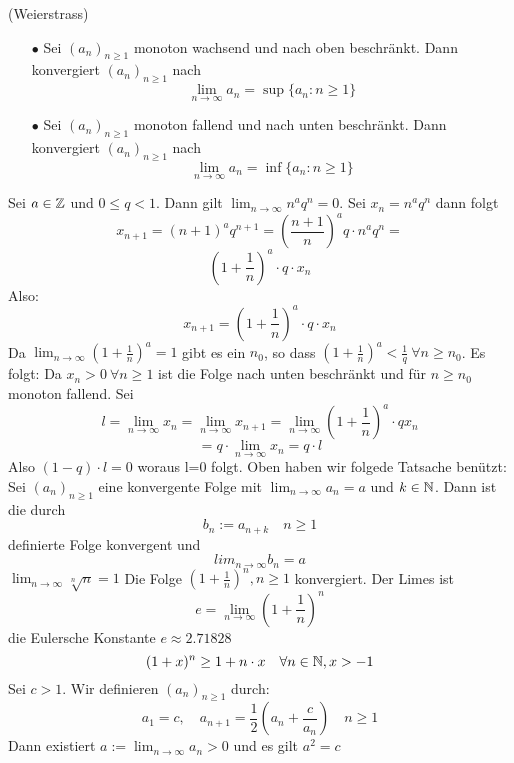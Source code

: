 \Satz[2.11] (Weierstrass)
\begin{enumerate}
    \item [\(\bullet\)] Sei \((a_n)_{n \geq 1}\) monoton wachsend und nach oben beschränkt. Dann konvergiert \((a_n)_{n \geq 1}\) nach \[\lim\limits_{n \rightarrow \infty} a_n = \sup\{a_n : n \geq 1\}\]
    \item [\(\bullet\)] Sei \((a_n)_{n \geq 1}\) monoton fallend und nach unten beschränkt. Dann konvergiert \((a_n)_{n \geq 1}\) nach \[\lim\limits_{n \rightarrow \infty} a_n = \inf\{a_n : n \geq 1\}\]
\end{enumerate}
\Bsp[2.12] Sei \( a \in \mathbb{Z}\) und \( 0 \leq q < 1\). Dann gilt \( \lim_{n \rightarrow \infty} n^a q^n = 0\).
Sei \( x_n = n^a q^n\) dann folgt
\[ x_{n+1} = (n+1)^a q^{n+1} = \left( \frac{n+1}{n}\right)^a q \cdot n^a q^n =\] 
\[\left( 1 + \frac{1}{n}\right)^a \cdot q \cdot x_n\] Also:
\[ x_{n+1} = \left( 1 + \frac{1}{n}\right)^a \cdot q \cdot x_n\]
Da \( \lim_{n \rightarrow \infty} \left( 1 + \frac{1}{n}\right)^a = 1\) gibt es ein \(n_0\), so dass \( \left( 1 + \frac{1}{n}\right)^a < \frac{1}{q} \ \forall n \geq n_0\). Es folgt:
Da \( x_n > 0 \ \forall n \geq 1\) ist die Folge nach unten beschränkt und für \( n \geq n_0\) monoton fallend. Sei
\[ l = \lim_{ n \rightarrow \infty} x_n = \lim_{n \rightarrow \infty} x_{n+1} = \lim_{n \rightarrow \infty} \left( 1 + \frac{1}{n}\right)^a \cdot qx_n \] 
\[= q \cdot \lim_{n \rightarrow \infty} x_n = q \cdot l\]
Also \( (1-q) \cdot l = 0\) woraus l=0 folgt. \newline
\Bem[2.13] Oben haben wir folgede Tatsache benützt: Sei \( (a_n)_{n \geq 1}\) eine konvergente Folge mit \( \lim_{n \rightarrow \infty} a_n = a\) und \(k \in \mathbb{N}\). Dann ist die durch
\[b_n:= a_{n+k} \quad n \geq 1\]
definierte Folge konvergent und
\[ lim_{n \rightarrow \infty} b_n = a\]
\Bsp[2.14] \( \lim_{n \rightarrow \infty} \sqrt[n]{n} = 1\) \newline
\Bsp[2.15] Die Folge \( \left( 1 + \frac{1}{n}\right)^n, n \geq 1\) konvergiert. Der Limes ist
\[ e = \lim_{n \rightarrow \infty } \left( 1 + \frac{1}{n} \right)^n\]
die Eulersche Konstante \( e \approx 2.71828\)
\[(1+x)^n \geq 1 + n \cdot x \quad \forall n \in \mathbb{N}, x > -1\]
\Bsp[2.17] Sei \( c > 1\). Wir definieren \( (a_n)_{n \geq 1}\) durch:
\[ a_1 = c, \quad a_{n+1} = \frac{1}{2} \left( a_n + \frac{c}{a_n}\right) \quad n \geq 1\]
Dann existiert \( a:= \lim_{n \rightarrow \infty} a_n > 0\) und es gilt \( a^2 = c\)
